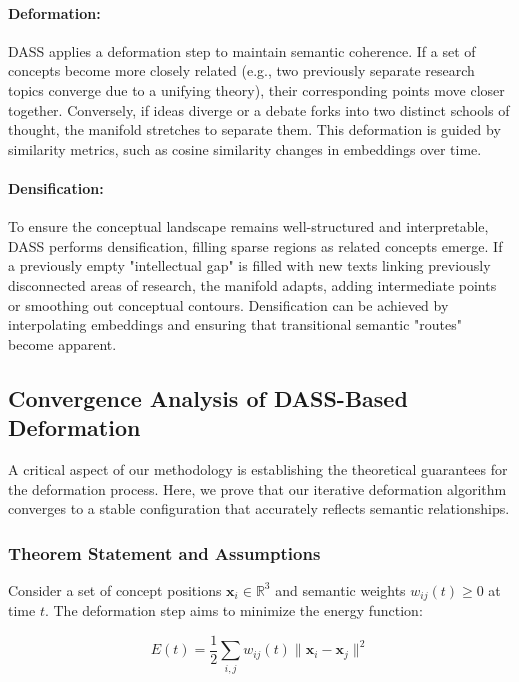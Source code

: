 \documentclass{article}
\begin{document}
\paragraph{Deformation:}
DASS applies a deformation step to maintain semantic coherence. If a set of concepts become more closely related (e.g., two previously separate research topics converge due to a unifying theory), their corresponding points move closer together. Conversely, if ideas diverge or a debate forks into two distinct schools of thought, the manifold stretches to separate them. This deformation is guided by similarity metrics, such as cosine similarity changes in embeddings over time.

\paragraph{Densification:}
To ensure the conceptual landscape remains well-structured and interpretable, DASS performs densification, filling sparse regions as related concepts emerge. If a previously empty "intellectual gap" is filled with new texts linking previously disconnected areas of research, the manifold adapts, adding intermediate points or smoothing out conceptual contours. Densification can be achieved by interpolating embeddings and ensuring that transitional semantic "routes" become apparent.

\subsection{Convergence Analysis of DASS-Based Deformation}
A critical aspect of our methodology is establishing the theoretical guarantees for the deformation process. Here, we prove that our iterative deformation algorithm converges to a stable configuration that accurately reflects semantic relationships.

\subsubsection{Theorem Statement and Assumptions}
Consider a set of concept positions $\mathbf{x}_i \in \mathbb{R}^3$ and semantic weights $w_{ij}(t) \geq 0$ at time $t$. The deformation step aims to minimize the energy function:

\begin{equation}
E(t) = \frac{1}{2}\sum_{i,j} w_{ij}(t) \|\mathbf{x}_i - \mathbf{x}_j\|^2
\label{eq:energy}
\end{equation}
\end{document}
